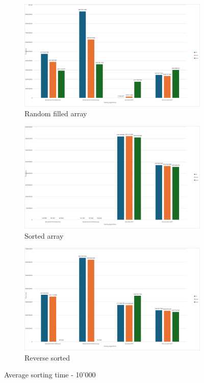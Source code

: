 \documentclass{article}
\begin{document}
    \begin{figure}[!h]
        \centering
        \begin{subfigure}{0.7\textwidth}
            \includegraphics[width=1\linewidth]{avg10000rand.png}
            \caption{Random filled array}
            \label{fig:avg10000sort}
        \end{subfigure}
        \begin{subfigure}{0.45\textwidth}
            \includegraphics[width=1\linewidth]{avg10000sort.png}
            \caption{Sorted array}
            \label{fig:avg10000sort}
        \end{subfigure}
        \hfill
        \begin{subfigure}{0.45\textwidth}
            \includegraphics[width=1\linewidth]{avg10000rev.png}
            \caption{Reverse sorted}
            \label{fig:avg10000rev}
        \end{subfigure}
        \caption{Average sorting time - 10'000}
        \label{fig:avg10000}
    \end{figure}
\end{document}
